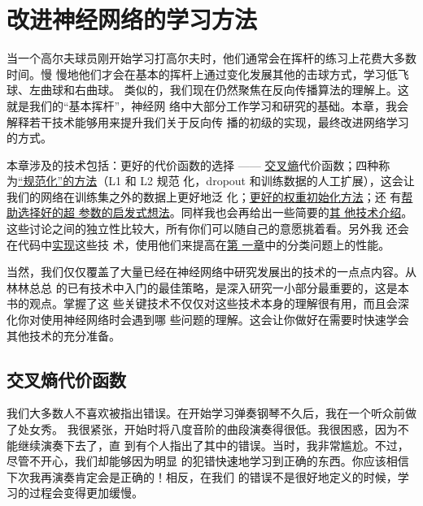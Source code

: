 
\chapter{改进神经网络的学习方法}
\label{ch:ImprovingTheWayNeuralNetworksLearn}

当一个高尔夫球员刚开始学习打高尔夫时，他们通常会在挥杆的练习上花费大多数时间。慢
慢地他们才会在基本的挥杆上通过变化发展其他的击球方式，学习低飞球、左曲球和右曲球。
类似的，我们现在仍然聚焦在反向传播算法的理解上。这就是我们的``基本挥杆''，神经网
络中大部分工作学习和研究的基础。本章，我会解释若干技术能够用来提升我们关于反向传
播的初级的实现，最终改进网络学习的方式。

本章涉及的技术包括：更好的代价函数的选择 ——
\hyperref[sec:the_cross-entropy_cost_function]{交叉熵}代价函数；四种称
为\hyperref[sec:overfitting_and_regularization]{``规范化''的方法}（L1 和 L2 规范
化，dropout 和训练数据的人工扩展），这会让我们的网络在训练集之外的数据上更好地泛
化；\hyperref[sec:weight_initialization]{更好的权重初始化方法}；还
有\hyperref[sec:how_to_choose_a_neural_network's_hyper-parameters]{帮助选择好的超
  参数的启发式想法}。同样我也会再给出一些简要的\hyperref[sec:other_techniques]{其
  他技术介绍}。这些讨论之间的独立性比较大，所有你们可以随自己的意愿挑着看。另外我
还会在代码中\hyperref[sec:handwriting_recognition_revisited_the_code]{实现}这些技
术，使用他们来提高在\hyperref[ch:UsingNeuralNetsToRecognizeHandwrittenDigits]{第
  一章}中的分类问题上的性能。

当然，我们仅仅覆盖了大量已经在神经网络中研究发展出的技术的一点点内容。从林林总总
的已有技术中入门的最佳策略，是深入研究一小部分最重要的，这是本书的观点。掌握了这
些关键技术不仅仅对这些技术本身的理解很有用，而且会深化你对使用神经网络时会遇到哪
些问题的理解。这会让你做好在需要时快速学会其他技术的充分准备。

\section{交叉熵代价函数}
\label{sec:the_cross-entropy_cost_function}

我们大多数人不喜欢被指出错误。在开始学习弹奏钢琴不久后，我在一个听众前做了处女秀。
我很紧张，开始时将八度音阶的曲段演奏得很低。我很困惑，因为不能继续演奏下去了，直
到有个人指出了其中的错误。当时，我非常尴尬。不过，尽管不开心，我们却能够因为明显
的犯错快速地学习到正确的东西。你应该相信下次我再演奏肯定会是正确的！相反，在我们
的错误不是很好地定义的时候，学习的过程会变得更加缓慢。

